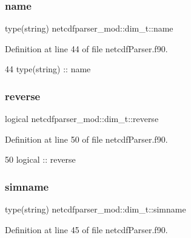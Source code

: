\subsubsection{\texorpdfstring{name}{name}}
{\footnotesize\ttfamily type(string) netcdfparser\+\_\+mod\+::dim\+\_\+t\+::name\hspace{0.3cm}{\ttfamily [private]}}



Definition at line 44 of file netcdf\+Parser.\+f90.


\begin{DoxyCode}
44         \textcolor{keywordtype}{type}(string) :: name
\end{DoxyCode}
\mbox{\label{structnetcdfparser__mod_1_1dim__t_aa9574f3a7c8ebb0acf0afa12c25a5180}} 
\subsubsection{\texorpdfstring{reverse}{reverse}}
{\footnotesize\ttfamily logical netcdfparser\+\_\+mod\+::dim\+\_\+t\+::reverse\hspace{0.3cm}{\ttfamily [private]}}



Definition at line 50 of file netcdf\+Parser.\+f90.


\begin{DoxyCode}
50         \textcolor{keywordtype}{logical} :: reverse
\end{DoxyCode}
\mbox{\label{structnetcdfparser__mod_1_1dim__t_a14ab4a777ae4e2429332ddc08f875601}} 
\subsubsection{\texorpdfstring{simname}{simname}}
{\footnotesize\ttfamily type(string) netcdfparser\+\_\+mod\+::dim\+\_\+t\+::simname\hspace{0.3cm}{\ttfamily [private]}}



Definition at line 45 of file netcdf\+Parser.\+f90.


